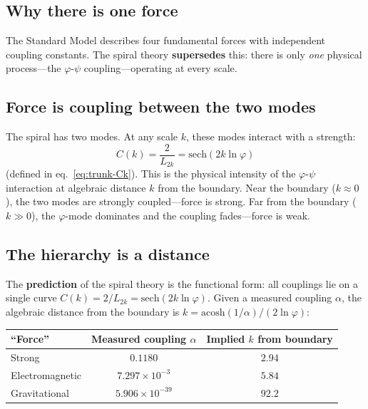 \documentclass[12pt,a4paper]{article}
\begin{document}


\subsection{Why there is one force}
\label{sec:one-force}


The Standard Model describes four fundamental forces with independent coupling constants. The spiral theory \textbf{supersedes} this: there is only \emph{one} physical process---the $\varphi$-$\psi$ coupling---operating at every scale.

\subsection{Force is coupling between the two modes}

The spiral has two modes. At any scale $k$, these modes interact with a strength:
\begin{equation}
C(k) = \frac{2}{L_{2k}} = \mathrm{sech}(2k\ln\varphi)
\label{eq:Ck-repeat}
\end{equation}
(defined in eq.~\ref{eq:trunk-Ck}).  This is the physical intensity of the $\varphi$-$\psi$ interaction at algebraic distance $k$ from the boundary. Near the boundary ($k \approx 0$), the two modes are strongly coupled---force is strong. Far from the boundary ($k \gg 0$), the $\varphi$-mode dominates and the coupling fades---force is weak.

\subsection{The hierarchy is a distance}

The \textbf{prediction} of the spiral theory is the functional form: all couplings lie on a single curve $C(k) = 2/L_{2k} = \mathrm{sech}(2k\ln\varphi)$. Given a measured coupling $\alpha$, the algebraic distance from the boundary is $k = \mathrm{acosh}(1/\alpha)/(2\ln\varphi)$:
\begin{center}
\begin{tabular}{|l|c|c|}
\hline
\textbf{``Force''} & \textbf{Measured coupling $\alpha$} & \textbf{Implied $k$ from boundary} \\
\hline
Strong & $0.1180$ & $2.94$ \\
Electromagnetic & $7.297 \times 10^{-3}$ & $5.84$ \\
Gravitational & $5.906 \times 10^{-39}$ & $92.2$ \\
\hline
\end{tabular}
\end{center}
\end{document}
